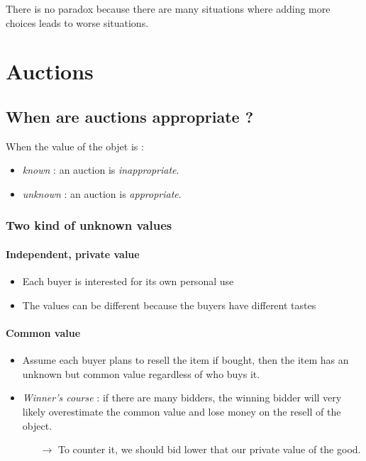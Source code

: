 There is no paradox because there are many situations where adding more choices leads to worse situations.

\chapter{Auctions}

\section{When are auctions appropriate ?}

When the value of the objet is :
\begin{itemize}
\item \textit{known} : an auction is \textit{inappropriate}.
\item \textit{unknown} : an auction is \textit{appropriate}.
\end{itemize}

\subsection{Two kind of unknown values}

\subsubsection{Independent, private value}

\begin{itemize}
\item Each buyer is interested for its own personal use
\item The values can be different because the buyers have different tastes
\end{itemize}

\subsubsection{Common value}

\begin{itemize}
\item Assume each buyer plans to resell the item if bought, then the item has an unknown but common value regardless of who buys it.
\item \textit{Winner's course} : if there are many bidders, the winning bidder will very likely overestimate the common value and lose money on the resell of the object.
	\begin{itemize}
	\item[$\rightarrow$] To counter it, we should bid lower that our private value of the good.
	\end{itemize}
\end{itemize}

